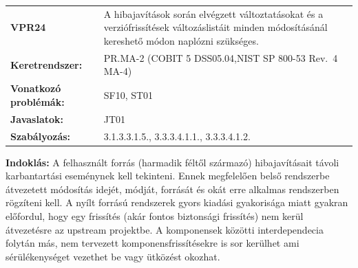\documentclass[12pt,magyar,a4paper,oneside]{scrreprt}
\begin{document}
\begin{longtable}[]{@{}ll@{}}
\toprule
\endhead
\begin{minipage}[t]{0.16\columnwidth}\raggedright
\textbf{VPR24}\strut
\end{minipage} & \begin{minipage}[t]{0.79\columnwidth}\raggedright
A hibajavítások során elvégzett változtatásokat és a verziófrissítések
változáslistáit minden módosításánál kereshető módon naplózni
szükséges.\strut
\end{minipage}\tabularnewline
\begin{minipage}[t]{0.16\columnwidth}\raggedright
\textbf{Keretrendszer:}\strut
\end{minipage} & \begin{minipage}[t]{0.79\columnwidth}\raggedright
PR.MA-2 (COBIT 5 DSS05.04,NIST SP 800-53 Rev.~4 MA-4)\strut
\end{minipage}\tabularnewline
\begin{minipage}[t]{0.16\columnwidth}\raggedright
\textbf{Vonatkozó problémák:}\strut
\end{minipage} & \begin{minipage}[t]{0.79\columnwidth}\raggedright
SF10, ST01\strut
\end{minipage}\tabularnewline
\begin{minipage}[t]{0.16\columnwidth}\raggedright
\textbf{Javaslatok:}\strut
\end{minipage} & \begin{minipage}[t]{0.79\columnwidth}\raggedright
JT01\strut
\end{minipage}\tabularnewline
\begin{minipage}[t]{0.16\columnwidth}\raggedright
\textbf{Szabályozás:}\strut
\end{minipage} & \begin{minipage}[t]{0.79\columnwidth}\raggedright
3.1.3.3.1.5., 3.3.3.4.1.1., 3.3.3.4.1.2.\strut
\end{minipage}\tabularnewline
\bottomrule
\end{longtable}

\textbf{Indoklás: } A felhasznált forrás (harmadik féltől származó)
hibajavításait távoli karbantartási eseménynek kell tekinteni. Ennek
megfelelően belső rendszerbe átvezetett módosítás idejét, módját,
forrását és okát erre alkalmas rendszerben rögzíteni kell. A nyílt
forrású rendszerek gyors kiadási gyakorisága miatt gyakran előfordul,
hogy egy frissítés (akár fontos biztonsági frissítés) nem kerül
átvezetésre az upstream projektbe. A komponensek közötti interdependecia
folytán más, nem tervezett komponensfrissítésekre is sor kerülhet ami
sérülékenységet vezethet be vagy ütközést okozhat.
\end{document}
